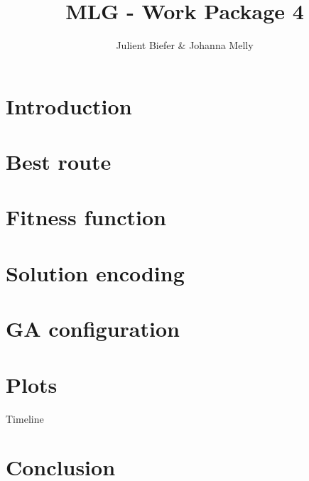 \documentclass[a4paper]{article} %
\begin{document}
\renewcommand{\labelitemi}{$\bullet$}
\renewcommand{\labelitemii}{$\cdot$}
\renewcommand{\labelitemiii}{$\diamond$}
\renewcommand{\labelitemiv}{$\ast$}
\author{Julient Biefer \& Johanna Melly}
\title{MLG - Work Package 4}
\maketitle
\section{Introduction}
\pagebreak
\section{Best route}
\section{Fitness function}
\pagebreak
\section{Solution encoding}
\section{GA configuration}
\pagebreak
\section{Plots}{Timeline}
\pagebreak
\section{Conclusion}
 
\end{document}
